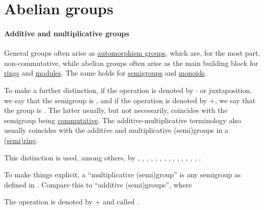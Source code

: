 \section{Abelian groups}\label{sec:abelian_groups}

\paragraph{Additive and multiplicative groups}

\begin{concept}\label{con:additive_semigroup}\mimprovised
  General groups often arise as \hyperref[def:automorphism_group]{automorphism groups}, which are, for the most part, non-commutative, while abelian groups often arise as the main building block for \hyperref[def:ring]{rings} and \hyperref[def:module]{modules}. The same holds for \hyperref[def:semigroup]{semigroups} and \hyperref[def:monoid]{monoids}.

  To make a further distinction, if the operation is denoted by \( \cdot \) or juxtaposition, we say that the semigroup is , and if the operation is denoted by \( + \), we say that the group is . The latter usually, but not necessarily, coincides with the semigroup being \hyperref[def:binary_operation/commutative]{commutative}. The additive-multiplicative terminology also usually coincides with the additive and multiplicative (semi)groups in a \hyperref[def:semiring]{(semi)ring}.

  This distinction is used, among others, by
  ,
  ,
  ,
  ,
  ,
  ,
  ,
  ,
  ,
  ,
  ,
  ,
  ,
  ,
  .

  To make things explicit, a \enquote{multiplicative (semi)group} is any semigroup as defined in . Compare this to \enquote{additive (semi)groups}, where
  \begin{thmenum}
     The operation is denoted by \( + \) and called .


\end{thmenum}
\end{concept}
